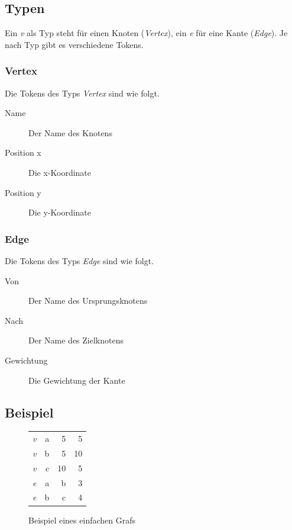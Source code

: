 \documentclass[a4paper,titlepage]{article}
\begin{document}
\subsection{Typen}

Ein \emph{v} als Typ steht für einen Knoten (\emph{Vertex}), ein \emph{e} für eine Kante (\emph{Edge}). Je nach Typ gibt es verschiedene Tokens.

\subsubsection{Vertex}

Die Tokens des Typs \emph{Vertex} sind wie folgt.

\begin{description}
\item[Name] Der Name des Knotens
\item[Position x] Die x-Koordinate
\item[Position y] Die y-Koordinate
\end{description}

\subsubsection{Edge}

Die Tokens des Typs \emph{Edge} sind wie folgt.

\begin{description}
\item[Von] Der Name des Ursprungsknotens
\item[Nach] Der Name des Zielknotens
\item[Gewichtung] Die Gewichtung der Kante
\end{description}

\subsection{Beispiel}

\begin{figure}[h!]
\begin{center}
\begin{tabular}{| l r r r |}
\hline
\emph{v} & a & 5 & 5 \\
\emph{v} & b & 5 & 10 \\
\emph{v} & c & 10 & 5 \\
\emph{e} & a & b & 3 \\
\emph{e} & b & c & 4 \\
\hline
\end{tabular}
\end{center}
\caption{Beispiel eines einfachen Grafs}
\end{figure}
\end{document}
